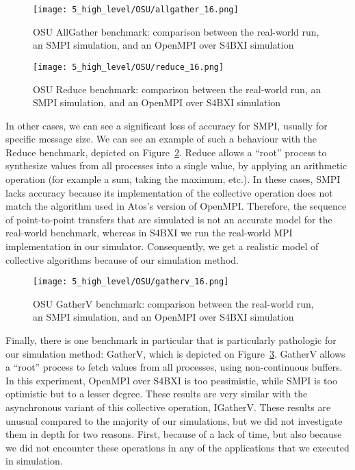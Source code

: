 \begin{figure}[!p]
    \centering
    \texttt{[image: 5\_high\_level/OSU/allgather\_16.png]}
    \caption{OSU AllGather benchmark: comparison between the real-world run, an SMPI simulation, and an OpenMPI over S4BXI simulation}
    \label{fig:5_high_level:osu_allgather_16}
\end{figure}

\begin{figure}[!p]
    \centering
    \texttt{[image: 5\_high\_level/OSU/reduce\_16.png]}
    \caption{OSU Reduce benchmark: comparison between the real-world run, an SMPI simulation, and an OpenMPI over S4BXI simulation}
    \label{fig:5_high_level:osu_reduce_16}
\end{figure}
\restoregeometry

In other cases, we can see a significant loss of accuracy for SMPI, usually for
specific message size. We can see an example of such a behaviour with the Reduce
benchmark, depicted on Figure~\ref{fig:5_high_level:osu_reduce_16}. Reduce
allows a ``root'' process to synthesize values from all processes into a single
value, by applying an arithmetic operation (for example a sum, taking the
maximum, etc.). In these cases, SMPI lacks accuracy because its implementation
of the collective operation does not match the algorithm used in Atos's version
of OpenMPI. Therefore, the sequence of point-to-point transfers that are
simulated is not an accurate model for the real-world benchmark, whereas in
S4BXI  we run the real-world MPI implementation  in our simulator. Consequently,
we get a realistic model of collective algorithms because of our simulation
method.

\begin{figure}[!ht]
    \centering
    \texttt{[image: 5\_high\_level/OSU/gatherv\_16.png]}
    \caption{OSU GatherV benchmark: comparison between the real-world run, an SMPI simulation, and an OpenMPI over S4BXI simulation}
    \label{fig:5_high_level:osu_gatherv_16}
\end{figure}

Finally, there is one benchmark in particular that is particularly pathologic
for our simulation method: GatherV, which is depicted on
Figure~\ref{fig:5_high_level:osu_gatherv_16}. GatherV allows a ``root'' process
to fetch values from all processes, using non-continuous buffers. In this
experiment, OpenMPI over S4BXI is too pessimistic, while SMPI is too optimistic
but to a lesser degree. These results are very similar with the asynchronous
variant of this collective operation, IGatherV. These results are unusual
compared to the majority of our simulations, but we did not investigate them in
depth for two reasons. First, because of a lack of time, but also because we did
not encounter these operations in any of the applications that we executed in
simulation.


